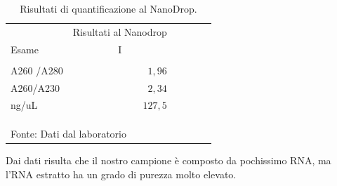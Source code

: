 \begin{table}[H]
\begin{center}

\caption{Risultati di quantificazione al NanoDrop.}
\vspace{0,3cm}
\begin{tabular}{lrrrrr}
   & \multicolumn{1}{c}{Risultati al Nanodrop} \\
   Esame & \multicolumn{1}{c}{I} \\ \hline
    & & & & & \\

  A260 /A280 & $1,96$  \\
 A260/A230 & $2,34$   \\
  ng/uL & $127,5$   \\ \\ \hline
       & & & & & \\
  & & & & &  \\ \multicolumn{6}{l}{\small Fonte: Dati dal laboratorio}
\end{tabular}

\end{center}
\end{table}

Dai dati risulta che il nostro campione è composto da pochissimo RNA,
ma l'RNA estratto ha un grado di purezza molto elevato.
